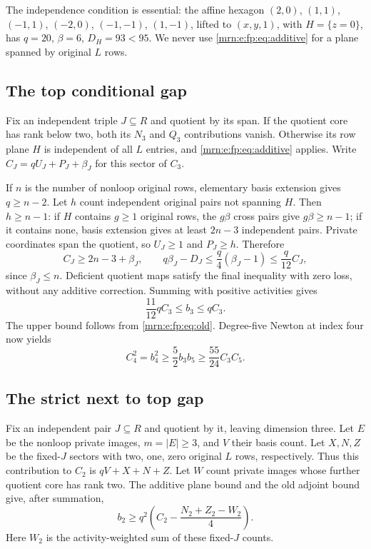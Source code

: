 \documentclass[11pt,a4paper]{article}
\theoremstyle{remark}\newtheorem{remark}[theorem]{Remark}
\begin{document}
The independence condition is essential: the affine hexagon $(2,0)$, $(1,1)$, $(-1,1)$, $(-2,0)$, $(-1,-1)$, $(1,-1)$, lifted to $(x,y,1)$, with $H=\{z=0\}$, has $q=20$, $\beta=6$, $D_H=93<95$. We never use \eqref{mrn:e:fp:eq:additive} for a plane spanned by original $L$ rows.

\subsection{The top conditional gap}
Fix an independent triple $J\subseteq R$ and quotient by its span. If the quotient core has rank below two, both its $N_3$ and $Q_3$ contributions vanish. Otherwise its row plane $H$ is independent of all $L$ entries, and \eqref{mrn:e:fp:eq:additive} applies. Write $C_J=qU_J+P_J+\beta_J$ for this sector of $C_3$.

If $n$ is the number of nonloop original rows, elementary basis extension gives $q\ge n-2$. Let $h$ count independent original pairs not spanning $H$. Then $h\ge n-1$: if $H$ contains $g\ge1$ original rows, the $g\beta$ cross pairs give $g\beta\ge n-1$; if it contains none, basis extension gives at least $2n-3$ independent pairs. Private coordinates span the quotient, so $U_J\ge1$ and $P_J\ge h$. Therefore
\[
 C_J\ge2n-3+\beta_J,\qquad
 q\beta_J-D_J\le\frac q4(\beta_J-1)\le\frac q{12}C_J,
\]
since $\beta_J\le n$. Deficient quotient maps satisfy the final inequality with zero loss, without any additive correction. Summing with positive activities gives
\begin{equation}\label{mrn:e:fp:eq:b3}
 \frac{11}{12}qC_3\le b_3\le qC_3.
\end{equation}
The upper bound follows from \eqref{mrn:e:fp:eq:old}. Degree-five Newton at index four now yields
\[
 C_4^2=b_4^2\ge\frac52 b_3b_5\ge\frac{55}{24}C_3C_5.
\]

\subsection{The strict next to top gap}
Fix an independent pair $J\subseteq R$ and quotient by it, leaving dimension three. Let $E$ be the nonloop private images, $m=|E|\ge3$, and $V$ their basis count. Let $X,N,Z$ be the fixed-$J$ sectors with two, one, zero original $L$ rows, respectively. Thus this contribution to $C_2$ is $qV+X+N+Z$. Let $W$ count private images whose further quotient core has rank two. The additive plane bound and the old adjoint bound give, after summation,
\begin{equation}\label{mrn:e:fp:eq:b2lower}
 b_2\ge q^2\left(C_2-\frac{N_2+Z_2-W_2}{4}\right).
\end{equation}
Here $W_2$ is the activity-weighted sum of these fixed-$J$ counts.
\end{document}
